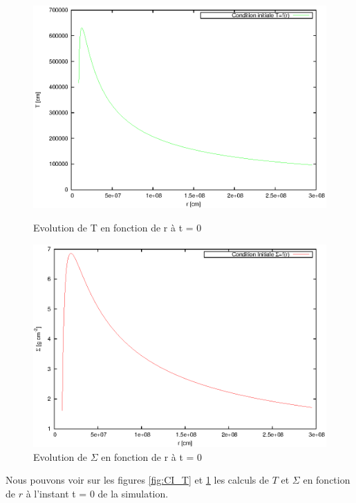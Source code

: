  \begin{figure}[ht]
   \begin{minipage}[c]{.46\linewidth}
      \includegraphics[scale=0.6]{ic_T.eps}
      \caption{Evolution de T en fonction de r à t = 0}\label{fig:CI_T}
   \end{minipage} \hfill
   \begin{minipage}[c]{.46\linewidth}
      \includegraphics[scale=0.6]{ic_Sig.eps}
      \caption{Evolution de $\Sigma$ en fonction de r à t = 0}\label{fig:CI_Sig}
   \end{minipage}
\end{figure} 


Nous pouvons voir sur les figures \ref{fig:CI_T} et \ref{fig:CI_Sig} les calculs de $T$ et $\Sigma$ en fonction de $r$ à l'instant t = 0 de la simulation. \\



